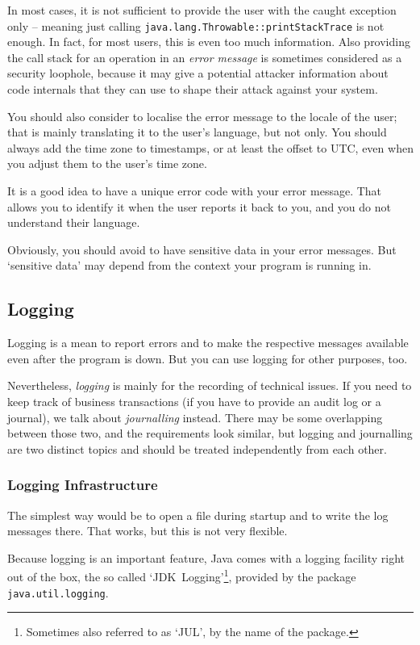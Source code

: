 \documentclass[11pt,a4paper, titlepage, parskip=half, headsepline, footsepline, cleardoublepage=current, headheight=1cm]{scrbook}
\begin{document}
In most cases, it is not sufficient to provide the user with the caught exception only – meaning just calling \lstinline|java.lang.Throwable::printStackTrace| is not enough. In fact, for most users, this is even too much information. Also providing the call stack for an operation in an \textit{error message} is sometimes considered as a security loophole, because it may give a potential attacker information about code internals that they can use to shape their attack against your system.

You should also consider to localise the error message to the locale of the user; that is mainly translating it to the user's language, but not only. You should always add the time zone to timestamps, or at least the offset to UTC, even when you adjust them to the user's time zone.

It is a good idea to have a unique error code with your error message. That allows you to identify it when the user reports it back to you, and you do not understand their language. 

Obviously, you should avoid to have sensitive data in your error messages. But ‘sensitive data’ may depend from the context your program is running in.

\subsection{Logging}\label{sec:Logging}
Logging is a mean to report errors and to make the respective messages available even after the program is down. But you can use logging for other purposes, too.

Nevertheless, \textit{logging} is mainly for the recording of technical issues. If you need to keep track of business transactions (if you have to provide an audit log or a journal), we talk about \textit{journalling} instead. There may be some overlapping between those two, and the requirements look similar, but logging and journalling are two distinct topics and should be treated independently from each other.

\subsubsection{Logging Infrastructure}
The simplest way would be to open a file during startup and to write the log messages there. That works, but this is not very flexible.

Because logging is an important feature, Java comes with a logging facility right out of the box, the so called ‘JDK~Logging’\footnote{Sometimes also referred to as ‘JUL’, by the name of the package.}, provided by the package \lstinline|java.util.logging|\autocite{ORACLE_DOC_LOGGING_PACKAGE, ORACLE_DOC_LOGGING_OVERVIEW}.
\end{document}
